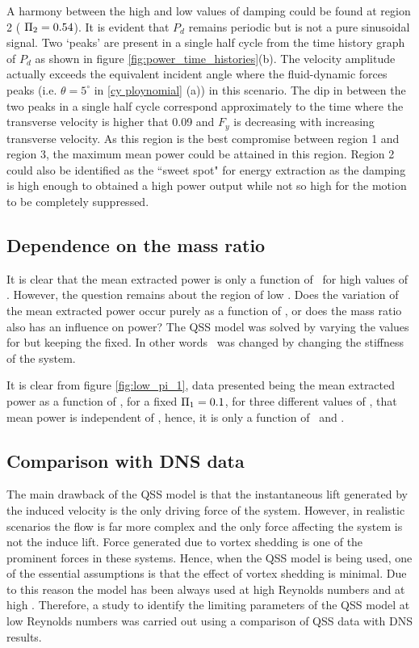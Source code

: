 A harmony between the high and low values of damping could be found at region 2  ( $\Pi_2=0.54$). It is evident that $P_d$ remains periodic but is not a pure sinusoidal signal. Two `peaks' are present in a single half cycle from the time history graph of $P_d$ as shown in figure \ref{fig:power_time_histories}(b). The velocity amplitude actually exceeds the equivalent incident angle where the fluid-dynamic forces peaks (i.e. $\theta=5^\circ$ in \ref{cy ploynomial} (a)) in this scenario. The dip in between the two peaks in a single half cycle correspond approximately to the time where the transverse velocity is higher that 0.09 and $F_y$ is decreasing with increasing transverse velocity. As this region is the best compromise between region 1 and region 3, the maximum mean power could be attained in this region. Region 2 could also be identified as the ``sweet spot" for energy extraction as the damping is high enough to obtained a high power output while not so high for the motion to be completely suppressed. 


\subsection{Dependence on the mass ratio \mstar}
\label{sec:chp-pi_1_pi2_mstar}


It is clear that the mean extracted power is only a function of \massdamp \ for high values of \massstiff. However, the question remains about the region of low \massstiff. Does the variation of the mean extracted power occur purely as a function of \massstiff, or does the mass ratio also has an influence on power? The QSS model was solved by varying the values for \mstar
but keeping the \massstiff fixed. In other words \massstiff\ was changed by changing the stiffness of the system. 
 
It is clear from figure \ref{fig:low_pi_1}, data presented being the mean extracted power  as a function of \massdamp, for a fixed $\Pi_1 = 0.1$, for three different values of \mstar, that mean power is independent of \mstar, hence, it is only a function of \massstiff\ and \massdamp.




\subsection{Comparison with DNS data}
\label{sec:chp-pi_1_pi2_dns}

The main drawback of the QSS model is that the instantaneous lift generated by the induced velocity is the only driving force of the system. However, in realistic scenarios the flow is far more complex and the only force affecting the system is not the induce lift. Force generated due to vortex shedding is one of the prominent forces in these systems. Hence, when the QSS model is being used, one of the essential assumptions is that the effect of vortex shedding is minimal. Due to this reason the model has been always used at high Reynolds numbers and at high \mstar. Therefore, a study to identify the limiting parameters of the QSS model at low Reynolds numbers was carried out  using a comparison of QSS data with DNS results.


